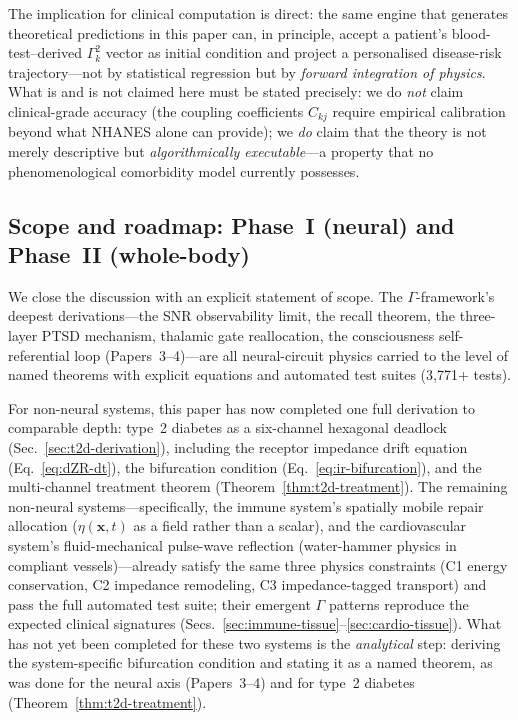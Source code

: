 \documentclass[aps,pre,twocolumn,superscriptaddress,floatfix]{revtex4-2}
\begin{document}
The implication for clinical computation is direct:
the same engine that generates theoretical predictions
in this paper can, in principle, accept a patient's
blood-test--derived $\Gamma_k^2$ vector as initial
condition and project a personalised
disease-risk trajectory---not by
statistical regression but by
\emph{forward integration of physics}.
What is and is not claimed here
must be stated precisely:
we do \emph{not} claim clinical-grade accuracy
(the coupling coefficients $C_{kj}$ require
empirical calibration beyond what NHANES alone
can provide); we \emph{do} claim that the
theory is not merely descriptive but
\emph{algorithmically executable}---a property
that no phenomenological comorbidity model
currently possesses.

\subsection{Scope and roadmap:
  Phase~I (neural) and Phase~II (whole-body)}
\label{sec:scope-roadmap}

We close the discussion with an explicit
statement of scope.
The $\Gamma$-framework's deepest derivations---the
SNR observability limit, the recall theorem,
the three-layer PTSD mechanism, thalamic gate
reallocation, the consciousness self-referential
loop (Papers~3--4)---are all neural-circuit physics
carried to the level of named theorems with
explicit equations and automated test suites
(3,771+ tests).

For non-neural systems, this paper has now
completed one full derivation to comparable depth:
type~2 diabetes as a six-channel hexagonal
deadlock (Sec.~\ref{sec:t2d-derivation}),
including the receptor impedance drift equation
(Eq.~\ref{eq:dZR-dt}), the bifurcation condition
(Eq.~\ref{eq:ir-bifurcation}), and the
multi-channel treatment theorem
(Theorem~\ref{thm:t2d-treatment}).
The remaining non-neural systems---specifically,
the immune system's spatially mobile repair
allocation ($\eta(\mathbf{x}, t)$ as a field
rather than a scalar), and the cardiovascular
system's fluid-mechanical pulse-wave reflection
(water-hammer physics in compliant vessels)---already
satisfy the same three physics constraints
(C1 energy conservation, C2 impedance remodeling,
C3 impedance-tagged transport) and pass the
full automated test suite;
their emergent $\Gamma$ patterns reproduce
the expected clinical signatures
(Secs.~\ref{sec:immune-tissue}--\ref{sec:cardio-tissue}).
What has not yet been completed for these two
systems is the \emph{analytical} step:
deriving the system-specific bifurcation
condition and stating it as a named theorem,
as was done for the neural axis
(Papers~3--4) and for type~2 diabetes
(Theorem~\ref{thm:t2d-treatment}).
\end{document}

